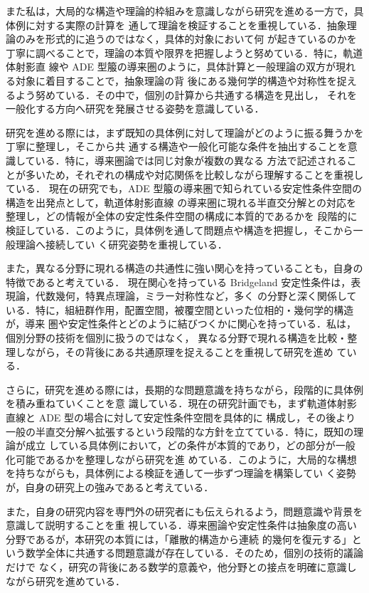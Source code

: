 \documentclass[11pt,a4paper]{ltjsarticle}
\newcommand{\研究課題名}{軌道体射影直線の導来圏の半直交分解とBridgeland安定性条件に関する研究}
\newcommand{\研究機関名}{大阪大学}
\newcommand{\研究代表者氏名}{山本 雄大}
\begin{document}
また私は，大局的な構造や理論的枠組みを意識しながら研究を進める一方で，具体例に対する実際の計算を
通して理論を検証することを重視している．抽象理論のみを形式的に追うのではなく，具体的対象において何
が起きているのかを丁寧に調べることで，理論の本質や限界を把握しようと努めている．特に，軌道体射影直
線や ADE 型箙の導来圏のように，具体計算と一般理論の双方が現れる対象に着目することで，抽象理論の背
後にある幾何学的構造や対称性を捉えるよう努めている．その中で，個別の計算から共通する構造を見出し，
それを一般化する方向へ研究を発展させる姿勢を意識している．

研究を進める際には，まず既知の具体例に対して理論がどのように振る舞うかを丁寧に整理し，そこから共
通する構造や一般化可能な条件を抽出することを意識している．特に，導来圏論では同じ対象が複数の異なる
方法で記述されることが多いため，それぞれの構成や対応関係を比較しながら理解することを重視している．
現在の研究でも，ADE 型箙の導来圏で知られている安定性条件空間の構造を出発点として，軌道体射影直線
の導来圏に現れる半直交分解との対応を整理し，どの情報が全体の安定性条件空間の構成に本質的であるかを
段階的に検証している．このように，具体例を通して問題点や構造を把握し，そこから一般理論へ接続してい
く研究姿勢を重視している．

また，異なる分野に現れる構造の共通性に強い関心を持っていることも，自身の特徴であると考えている．
現在関心を持っている Bridgeland 安定性条件は，表現論，代数幾何，特異点理論，ミラー対称性など，多く
の分野と深く関係している．特に，組紐群作用，配置空間，被覆空間といった位相的・幾何学的構造が，導来
圏や安定性条件とどのように結びつくかに関心を持っている．私は，個別分野の技術を個別に扱うのではなく，
異なる分野で現れる構造を比較・整理しながら，その背後にある共通原理を捉えることを重視して研究を進め
ている．

さらに，研究を進める際には，長期的な問題意識を持ちながら，段階的に具体例を積み重ねていくことを意
識している．現在の研究計画でも，まず軌道体射影直線と ADE 型の場合に対して安定性条件空間を具体的に
構成し，その後より一般の半直交分解へ拡張するという段階的な方針を立てている．特に，既知の理論が成立
している具体例において，どの条件が本質的であり，どの部分が一般化可能であるかを整理しながら研究を進
めている．このように，大局的な構想を持ちながらも，具体例による検証を通して一歩ずつ理論を構築してい
く姿勢が，自身の研究上の強みであると考えている．

また，自身の研究内容を専門外の研究者にも伝えられるよう，問題意識や背景を意識して説明することを重
視している．導来圏論や安定性条件は抽象度の高い分野であるが，本研究の本質には，「離散的構造から連続
的幾何を復元する」という数学全体に共通する問題意識が存在している．そのため，個別の技術的議論だけで
なく，研究の背後にある数学的意義や，他分野との接点を明確に意識しながら研究を進めている．
\end{document}
